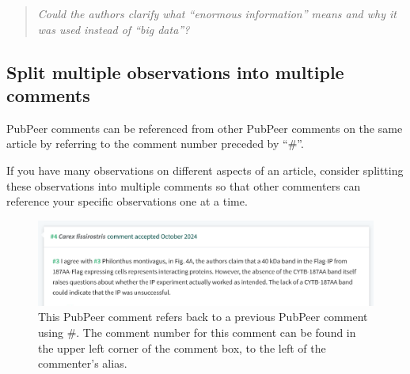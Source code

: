 \documentclass[letterpaper, 12pt]{article}
\begin{document}
\begin{quote}
    \textit{Could the authors clarify what ``enormous information'' means and why it was used instead of ``big data''?}
\end{quote}

\subsection*{Split multiple observations into multiple comments}

PubPeer comments can be referenced from other PubPeer comments on the same article by referring to the comment number preceded by ``\#''.

If you have many observations on different aspects of an article, consider splitting these observations into multiple comments so that other commenters can reference your specific observations one at a time.

\begin{figure}[h!tbp]
    \includegraphics[width=\textwidth]{img/pubpeer/Screenshot 2024-10-23 at 16-36-04 PubPeer - A novel protein CYTB-187AA encoded by the mitochondrial gene.png}
    \caption*{This PubPeer comment refers back to a previous PubPeer comment using \#. The comment number for this comment can be found in the upper left corner of the comment box, to the left of the commenter's alias.}
\end{figure}
\end{document}
